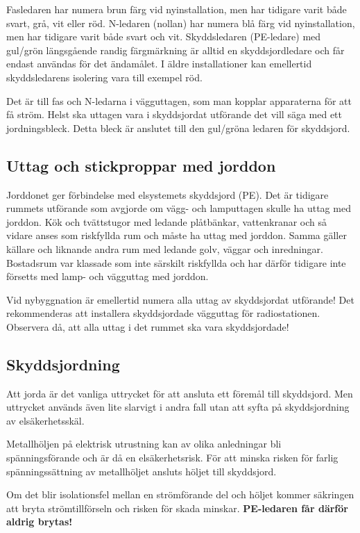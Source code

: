 Fasledaren har numera brun färg vid nyinstallation, men har tidigare varit
både svart, grå, vit eller röd.
N-ledaren (nollan) har numera blå färg vid nyinstallation, men har tidigare
varit både svart och vit.
Skyddsledaren (PE-ledare) med gul/grön längsgående randig färgmärkning är
alltid en skyddsjordledare och får endast användas för det ändamålet.
I äldre installationer kan emellertid skyddsledarens isolering vara till
exempel röd.

Det är till fas och N-ledarna i vägguttagen, som man kopplar apparaterna för
att få ström.
Helst ska uttagen vara i skyddsjordat utförande det vill säga med ett
jordningsbleck.
Detta bleck är anslutet till den gul/gröna ledaren för skyddsjord.

\subsection{Uttag och stickproppar med jorddon}

Jorddonet ger förbindelse med elsystemets skyddsjord (PE).
Det är tidigare rummets utförande som avgjorde om vägg- och lamputtagen skulle
ha uttag med jorddon.
Kök och tvättstugor med ledande plåtbänkar, vattenkranar och så vidare anses
som riskfyllda rum och måste ha uttag med jorddon.
Samma gäller källare och liknande andra rum med ledande golv, väggar och
inredningar.
Bostadsrum var klassade som inte särskilt riskfyllda och har därför tidigare
inte försetts med lamp- och vägguttag med jorddon.

Vid nybyggnation är emellertid numera alla uttag av skyddsjordat utförande!
Det rekommenderas att installera skyddsjordade vägguttag för radiostationen.
Observera då, att alla uttag i det rummet ska vara skyddsjordade!

\subsection{Skyddsjordning}

Att jorda är det vanliga uttrycket för att ansluta ett föremål till skyddsjord.
Men uttrycket används även lite slarvigt i andra fall utan att syfta på
skyddsjordning av elsäkerhetsskäl.

Metallhöljen på elektrisk utrustning kan av olika anledningar bli
spänningsförande och är då en elsäkerhetsrisk.
För att minska risken för farlig spänningssättning av metallhöljet ansluts
höljet till skyddsjord.

\begin{center}
\begin{minipage}{0.19\columnwidth}
\Huge{\selectfont{}\relax}
\end{minipage}
\begin{minipage}{0.7\columnwidth}
Om det blir isolationsfel mellan en strömförande del och höljet kommer
säkringen att bryta strömtillförseln och risken för skada minskar.
\textbf{PE-ledaren får därför aldrig brytas!}
\end{minipage}
\end{center}


